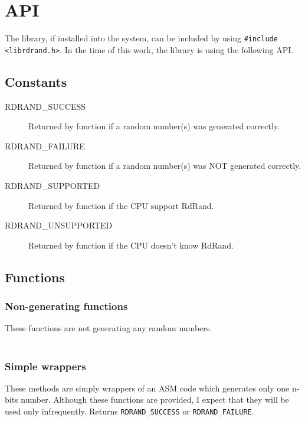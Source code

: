 \section{API} \label{sec:library-api}
The library, if installed into the system, can be included by using {\tt \#include <librdrand.h>}. In the time of this work, the library is using the following API.

\subsection{Constants}
\begin{description}
  \item[RDRAND\_SUCCESS] Returned by function if a random number(s) was generated correctly.
  \item[RDRAND\_FAILURE] Returned by function if a random number(s) was NOT generated correctly.
  \item[RDRAND\_SUPPORTED] Returned by  function if the CPU support RdRand.
  \item[RDRAND\_UNSUPPORTED] Returned by  function if the CPU doesn't know RdRand.
  
\end{description}


\subsection{Functions}

\subsubsection{Non-generating functions}

These functions are not generating any random numbers.\\

\\

\subsubsection{Simple wrappers}\label{subsec:api:simple-wrappers}
These methods are simply wrappers of an ASM code which generates only one n-bits number. Although these functions are provided, I expect that they will be used only infrequently. Returns {\tt RDRAND\_SUCCESS} or {\tt RDRAND\_FAILURE}.\\

